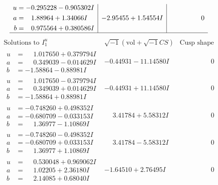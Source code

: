 \documentclass[1p]{elsarticle_modified}
\theoremstyle{definition}
\newcommand{\I}{\sqrt{-1}}
\begin{document}
$$\begin{array}{c|c|c}
\begin{aligned}
u &= -0.295228 - 0.905302 I \\
a &= \phantom{-}1.88964 + 1.34066 I \\
b &= \phantom{-}0.975564 + 0.380586 I\end{aligned}
 & -2.95455 + 1.54554 I & \phantom{-0.000000 } 0\\
 \hline 
 \end{array}$$\newpage$$\begin{array}{c|c|c}  
\text{Solutions to }I^u_{1}& \I (\text{vol} + \sqrt{-1}CS) & \text{Cusp shape}\\
 \hline 
\begin{aligned}
u &= \phantom{-}1.017650 + 0.379794 I \\
a &= \phantom{-}0.349039 - 0.014629 I \\
b &= -1.58864 - 0.88981 I\end{aligned}
 & -0.44931 - 11.14580 I & \phantom{-0.000000 } 0 \\ \hline\begin{aligned}
u &= \phantom{-}1.017650 - 0.379794 I \\
a &= \phantom{-}0.349039 + 0.014629 I \\
b &= -1.58864 + 0.88981 I\end{aligned}
 & -0.44931 + 11.14580 I & \phantom{-0.000000 } 0 \\ \hline\begin{aligned}
u &= -0.748260 + 0.498352 I \\
a &= -0.680709 - 0.033153 I \\
b &= \phantom{-}1.36977 - 1.10869 I\end{aligned}
 & \phantom{-}3.41784 + 5.58312 I & \phantom{-0.000000 } 0 \\ \hline\begin{aligned}
u &= -0.748260 - 0.498352 I \\
a &= -0.680709 + 0.033153 I \\
b &= \phantom{-}1.36977 + 1.10869 I\end{aligned}
 & \phantom{-}3.41784 - 5.58312 I & \phantom{-0.000000 } 0 \\ \hline\begin{aligned}
u &= \phantom{-}0.530048 + 0.969062 I \\
a &= \phantom{-}1.02205 + 2.36180 I \\
b &= \phantom{-}2.14085 + 0.68040 I\end{aligned}
 & -1.64510 + 2.76495 I & \phantom{-0.000000 } 0 \\ \hline\begin{aligned}

\end{aligned}
\end{array}$$
\end{document}
